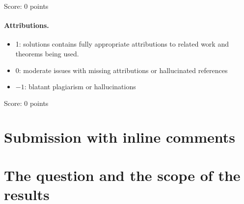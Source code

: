 \documentclass[11pt]{article}
\theoremstyle{definition}
\theoremstyle{remark}
\begin{document}
\noindent Score: 0 points

\paragraph{Attributions.}
\begin{itemize}
	\item  1: solutions contains fully appropriate attributions
		to related work and theorems being used.
	\item  0: moderate issues with missing attributions or hallucinated references
	\item  $-1$: blatant plagiarism or hallucinations
\end{itemize}

\noindent Score: 0  points

\newpage
\section{Submission with inline comments}


\begin{abstract}
We consider deformations of a smooth totally geodesic surface in the moduli space of curves, with smoothly trivial intersections with every boundary stratum and a compatibility condition on incidences in fixed open sets. The question is whether a pointed component that is constant along a boundary curve must also be constant in the deformation parameter. We prove that, if this selected factor changes, compatibility forces the whole boundary curve into the closures of all larger incident boundary strata. If the compactified fibers are algebraic surfaces with no component contained in the boundary, this proves the desired constancy for strata with at least two nodes. A second criterion proves constancy whenever the boundary curves have a common stable limit; isolated-point conditions imply this criterion in several cases. We also analyze the ambiguity at a two-node separating chain and give examples delimiting compactification and lifting arguments. The original assertion, without the additional conditions in these criteria, remains unresolved here.
\end{abstract}

\section{The question and the scope of the results}
\end{document}
